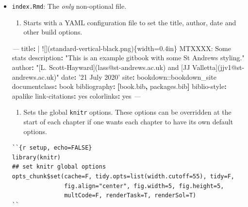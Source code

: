\documentclass[
]{book}
\newenvironment{Shaded}{\begin{snugshade}}{\end{snugshade}}
\newcommand{\AttributeTok}[1]{\textcolor[rgb]{0.77,0.63,0.00}{#1}}
\newcommand{\CharTok}[1]{\textcolor[rgb]{0.31,0.60,0.02}{#1}}
\newcommand{\FunctionTok}[1]{\textcolor[rgb]{0.00,0.00,0.00}{#1}}
\newcommand{\KeywordTok}[1]{\textcolor[rgb]{0.13,0.29,0.53}{\textbf{#1}}}
\newcommand{\NormalTok}[1]{#1}
\newcommand{\PreprocessorTok}[1]{\textcolor[rgb]{0.56,0.35,0.01}{\textit{#1}}}
\newcommand{\StringTok}[1]{\textcolor[rgb]{0.31,0.60,0.02}{#1}}
\providecommand{\tightlist}{%
  \setlength{\itemsep}{0pt}\setlength{\parskip}{0pt}}
\theoremstyle{definition}
\theoremstyle{definition}
\theoremstyle{definition}
\theoremstyle{remark}
\begin{document}
\begin{itemize}
\item
  \texttt{index.Rmd}: The \emph{only} non-optional file.

  \begin{enumerate}
  \def\labelenumi{\arabic{enumi}.}
  \tightlist
  \item
    Starts with a YAML configuration file to set the title, author, date and other build options.
  \end{enumerate}

\begin{Shaded}
\begin{Highlighting}[]
\PreprocessorTok{--- }
\FunctionTok{title}\KeywordTok{: }\CharTok{|}
\NormalTok{  ![](standard-vertical-black.png)\{width=0.4in\} MTXXXX: Some stats}
\FunctionTok{description}\KeywordTok{:}\AttributeTok{ }\StringTok{"This is an example gitbook with some St Andrews styling."}
\FunctionTok{author}\KeywordTok{:}\AttributeTok{ }\StringTok{"[L. Scott-Hayward](lass@st-andrews.ac.uk) and [JJ Valletta](jjv1@st-andrews.ac.uk)"}
\FunctionTok{date}\KeywordTok{:}\AttributeTok{ }\StringTok{'21 July 2020'}
\FunctionTok{site}\KeywordTok{:}\AttributeTok{ bookdown::bookdown_site}
\FunctionTok{documentclass}\KeywordTok{:}\AttributeTok{ book}
\FunctionTok{bibliography}\KeywordTok{:}\AttributeTok{ }\KeywordTok{[}\AttributeTok{book.bib}\KeywordTok{,}\AttributeTok{ packages.bib}\KeywordTok{]}
\FunctionTok{biblio-style}\KeywordTok{:}\AttributeTok{ apalike}
\FunctionTok{link-citations}\KeywordTok{:}\AttributeTok{ }\CharTok{yes}
\FunctionTok{colorlinks}\KeywordTok{:}\AttributeTok{ }\CharTok{yes}
\PreprocessorTok{---}
\end{Highlighting}
\end{Shaded}

  \begin{enumerate}
  \def\labelenumi{\arabic{enumi}.}
  \setcounter{enumi}{1}
  \tightlist
  \item
    Sets the global \texttt{knitr} options. These options can be overridden at the start of each chapter if one wants each chapter to have its own default options.
  \end{enumerate}

\begin{verbatim}
``{r setup, echo=FALSE}
library(knitr)
## set knitr global options
opts_chunk$set(cache=F, tidy.opts=list(width.cutoff=55), tidy=F, 
               fig.align="center", fig.width=5, fig.height=5,
               multCode=F, renderTask=T, renderSol=T)
``
\end{verbatim}


\end{itemize}
\end{document}
